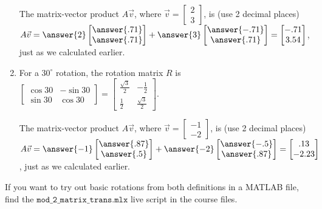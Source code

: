 \documentclass{ximera}
\begin{document}
\begin{exploration}
\begin{remark}
\begin{example}
\begin{enumerate}
                The matrix-vector product $A\vec{v}$, where $\vec{v}=\begin{bmatrix} 2 \\ 3 \end{bmatrix}$, is (use 2 decimal places) $A\vec{v}=\answer{2}\begin{bmatrix} \answer{.71} \\ \answer{.71} \end{bmatrix} + \answer{3}\begin{bmatrix} \answer{-.71} \\ \answer{.71} \end{bmatrix} = \begin{bmatrix} -.71 \\ 3.54 \end{bmatrix}$, just as we calculated earlier.

                \item For a $30^\circ$ rotation, the rotation matrix $R$ is $\begin{bmatrix} \cos 30 & -\sin 30 \\ \sin 30 & \cos 30 \end{bmatrix} = \begin{bmatrix} \frac{\sqrt{3}}{2} & -\frac{1}{2} \\ \frac{1}{2} & \frac{\sqrt{3}}{2} \end{bmatrix}$.
                
                The matrix-vector product $A\vec{v}$, where $\vec{v}=\begin{bmatrix} -1 \\ -2 \end{bmatrix}$, is (use 2 decimal places) $A\vec{v}=\answer{-1}\begin{bmatrix} \answer{.87} \\ \answer{.5} \end{bmatrix} + \answer{-2}\begin{bmatrix} \answer{-.5} \\ \answer{.87} \end{bmatrix} = \begin{bmatrix} .13 \\ -2.23 \end{bmatrix}$, just as we calculated earlier.
            \end{enumerate}

            \begin{hint}
            
                If you want to try out basic rotations from both definitions in a MATLAB file, find the $\texttt{mod\_2\_matrix\_trans.mlx}$ live script in the course files.


\end{hint}
\end{example}
\end{remark}
\end{exploration}
\end{document}
